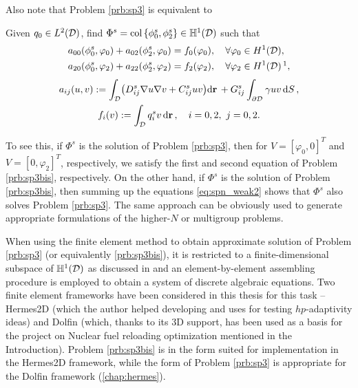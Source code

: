 Also note that Problem \ref{prb:sp3} is equivalent to
\begin{problembis}\label{prb:sp3bis}
Given $q_0 \in \Lp[2](\VV)$, find $\Phi^s = \col \{\phi^s_0, \phi^s_2\} \in \mathbb{H}^1(\VV)$ such that
\begin{equation}\label{eq:spn_weak2}
\begin{gathered}
\begin{aligned}
	a_{00}(\phi^s_0, \varphi_0) + a_{02}(\phi^s_2, \varphi_0) &= f_0(\varphi_0),\quad \forall \varphi_0\in H^1(\VV),\\
	a_{20}(\phi^s_0, \varphi_2) + a_{22}(\phi^s_2, \varphi_2) &= f_2(\varphi_2),\quad \forall \varphi_2\in H^1(\VV)\,
	\footnotemark,
\end{aligned}\\[.3em] 
	a_{ij}(u,v) := \int_{\VV} \bigl({D}^s_{ij}\nabla u \nabla v +
	C^s_{ij} u v \bigr)\d{\br} + G^s_{ij} \int_{\pV} \gamma u v
	\,\d{S},\\
 	f_i(v) := \int_{\VV}q^s_i v\,\d{\br},\quad i = 0,2,\ j = 0,2.
\end{gathered} 
\end{equation}
\end{problembis}%
%
To see this, if $\Phi^s$ is
the solution of Problem \ref{prb:sp3}, then for $V = [\varphi_0,0]^T$ and $V =[0,\varphi_2]^T$, respectively, we satisfy the first and second equation of Problem \ref*{prb:sp3bis}, respectively. On the other hand, if $\Phi^s$ is the solution of Problem \ref*{prb:sp3bis}, then summing up the equations \eqref{eq:spn_weak2} shows that
$\Phi^s$ also solves Problem \ref{prb:sp3}. The same approach can be obviously used to generate appropriate formulations
of the higher-$N$ or multigroup problems.

When using the finite element method to obtain approximate solution of Problem \ref{prb:sp3} (or equivalently
\ref{prb:sp3bis}), it is restricted to a finite-dimensional subspace of $\mathbb{H}^1(\VV)$ as discussed
in  and an element-by-element assembling procedure is employed to obtain a system of discrete algebraic
equations. Two finite element frameworks have been considered in this thesis for this task --
Hermes2D (which the author helped developing and uses for testing $hp$-adaptivity ideas) and Dolfin (which, thanks to
its 3D support, has been used as a basis for the project on Nuclear fuel reloading optimization mentioned in the
Introduction). Problem \ref{prb:sp3bis} is in the form suited for implementation in the Hermes2D framework, while the
form of Problem \ref{prb:sp3} is appropriate for the Dolfin framework (\cref{chap:hermes}).

